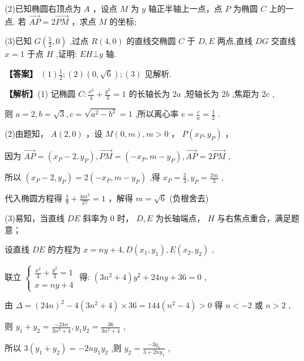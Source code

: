 \documentclass[10pt]{article}
\begin{document}
(2)已知椭圆右顶点为 \(A\) ，设点 \(M\) 为 \(y\) 轴正半轴上一点，点 \(P\) 为椭圆 \(C\) 上的一点. 若 \(\overrightarrow{AP} = 2\overrightarrow{PM}\) ，求点 \(M\) 的坐标;

(3)已知 \(G\left( {\frac{5}{2},0}\right)\) ,过点 \(R\left( {4,0}\right)\) 的直线交椭圆 \(C\) 于 \(D,E\) 两点,直线 \({DG}\) 交直线 \(x = 1\) 于点 \(H\) ,证明: \({EH} \bot  y\) 轴.

\textbf{【答案】} \(\left( 1\right) \frac{1}{2};\left( 2\right) \left( {0,\sqrt{6}}\right) ;\left( 3\right)\) 见解析.

\textbf{【解析】}(1) 记椭圆 \(C : \frac{{x}^{2}}{4} + \frac{{y}^{2}}{3} = 1\) 的长轴长为 \({2a}\) ,短轴长为 \({2b}\) ,焦距为 \({2c}\) ,

则 \(a = 2,b = \sqrt{3},c = \sqrt{{a}^{2} - {b}^{2}} = 1\) ,所以离心率 \(e = \frac{c}{a} = \frac{1}{2}\) .

(2)由题知， \(A\left( {2,0}\right)\) ，设 \(M\left( {0,m}\right) ,m > 0\) ， \(P\left( {{x}_{P},{y}_{P}}\right)\) ，

因为 \(\overrightarrow{AP} = \left( {{x}_{P} - 2,{y}_{P}}\right) ,\overrightarrow{PM} = \left( {-{x}_{P},m - {y}_{P}}\right) ,\overrightarrow{AP} = 2\overrightarrow{PM}\) ,

所以 \(\left( {{x}_{P} - 2,{y}_{P}}\right)  = 2\left( {-{x}_{P},m - {y}_{P}}\right)\) ,得 \({x}_{P} = \frac{2}{3},{y}_{P} = \frac{2m}{3}\) ,

代入椭圆方程得 \(\frac{1}{9} + \frac{4{m}^{2}}{27} = 1\) ，解得 \(m = \sqrt{6}\) (负根舍去)

(3)易知，当直线 \({DE}\) 斜率为 0 时， \(D,E\) 为长轴端点， \(H\) 与右焦点重合，满足题意；

设直线 \({DE}\) 的方程为 \(x = {ny} + 4,D\left( {{x}_{1},{y}_{1}}\right) ,E\left( {{x}_{2},{y}_{2}}\right)\) ,

联立 \(\left\{  \begin{array}{l} \frac{{x}^{2}}{4} + \frac{{y}^{2}}{3} = 1 \\  x = {ny} + 4 \end{array}\right.\) 得: \(\left( {3{n}^{2} + 4}\right) {y}^{2} + {24ny} + {36} = 0\) ,

由 \(\Delta  = {\left( {24}n\right) }^{2} - 4\left( {3{n}^{2} + 4}\right)  \times  {36} = {144}\left( {{n}^{2} - 4}\right)  > 0\) 得 \(n <  - 2\) 或 \(n > 2\) ,

则 \({y}_{1} + {y}_{2} = \frac{-{24n}}{3{n}^{2} + 4},{y}_{1}{y}_{2} = \frac{36}{3{n}^{2} + 4}\) ,

所以 \(3\left( {{y}_{1} + {y}_{2}}\right)  =  - {2n}{y}_{1}{y}_{2}\) ,则 \({y}_{2} = \frac{-3{y}_{1}}{3 + {2n}{y}_{1}}\) ,
\end{document}
